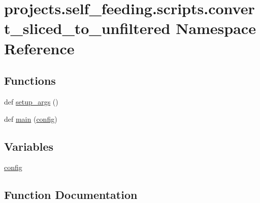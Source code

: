 \hypertarget{namespaceprojects_1_1self__feeding_1_1scripts_1_1convert__sliced__to__unfiltered}{}\section{projects.\+self\+\_\+feeding.\+scripts.\+convert\+\_\+sliced\+\_\+to\+\_\+unfiltered Namespace Reference}
\label{namespaceprojects_1_1self__feeding_1_1scripts_1_1convert__sliced__to__unfiltered}
\subsection*{Functions}
\begin{DoxyCompactItemize}
\item 
def \hyperlink{namespaceprojects_1_1self__feeding_1_1scripts_1_1convert__sliced__to__unfiltered_a13c1e69c48c191e9cc6f8d257b79152d}{setup\+\_\+args} ()
\item 
def \hyperlink{namespaceprojects_1_1self__feeding_1_1scripts_1_1convert__sliced__to__unfiltered_a552f368b316e70524ec9118b03841486}{main} (\hyperlink{namespaceprojects_1_1self__feeding_1_1scripts_1_1convert__sliced__to__unfiltered_a7138270b9589cbf6a9c6f608a6e50c21}{config})
\end{DoxyCompactItemize}
\subsection*{Variables}
\begin{DoxyCompactItemize}
\item 
\hyperlink{namespaceprojects_1_1self__feeding_1_1scripts_1_1convert__sliced__to__unfiltered_a7138270b9589cbf6a9c6f608a6e50c21}{config}
\end{DoxyCompactItemize}


\subsection{Function Documentation}
\mbox{\label{namespaceprojects_1_1self__feeding_1_1scripts_1_1convert__sliced__to__unfiltered_a552f368b316e70524ec9118b03841486}} 
